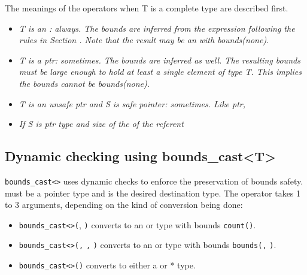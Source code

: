 The meanings of the operators when T is a complete type are described
first.

\begin{quote}
\end{quote}

\begin{itemize}
\item
  \it{T is an \arrayptr: always. The bounds are inferred from the
  expression following the rules in Section . Note that the result may
  be an \arrayptr with bounds(none).}
\item
  \it{T is a ptr: sometimes. The bounds are inferred as well. The
  resulting bounds must be large enough to hold at least a single
  element of type T. This implies the bounds cannot be bounds(none).}
\item
  \it{T is an unsafe ptr and S is safe pointer: sometimes. Like ptr, }
    \item
    \it{If S is ptr type and size of the of the referent }
\end{itemize}

\subsection{Dynamic checking using bounds\_cast\textless{}T\textgreater{}}
\label{dynamic-checking-using-boundsux5fcastt}

\texttt{bounds\_cast\textless{}}\texttt{\textgreater{}} uses
dynamic checks to enforce the preservation of bounds safety. 
must be a pointer type and is the desired destination type. The operator
takes 1 to 3 arguments, depending on the kind of conversion being done:

\begin{itemize}
\item
  \texttt{bounds\_cast\textless{}}\texttt{\textgreater{}(},
  \texttt{)} converts  to an \arrayptr or
  \arrayview type with bounds
  \texttt{count(}\texttt{)}.
\item
  \texttt{bounds\_cast\textless{}}\texttt{\textgreater{}(}\texttt{,}
  \texttt{,} \texttt{)} converts  to an
  \arrayptr or \arrayview type with bounds
  \texttt{bounds(}\texttt{,} \texttt{)}.
\item
  \texttt{bounds\_cast\textless{}}\texttt{\textgreater{}(}\texttt{)}
  converts  to either a \ptr or * type.
\end{itemize}

